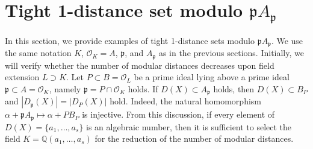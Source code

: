 \documentclass[a4paper, 11pt]{article}
\newcommand{\Q}{\mathbb{Q}}
\newcommand{\p}{\mathfrak{p}}
\newcommand{\Oc}{\mathcal{O}}
\theoremstyle{definition}
\begin{document}
\section{Tight 1-distance set modulo $\p A_\p$} \label{sec:example}
In this section, we provide examples of tight 1-distance sets modulo $\p A_\p$. 
We use the same notation $K$, $\Oc_K=A$, $\p$, and $A_\p$ as in the previous sections. 
Initially, we will verify whether the number of modular distances decreases upon field extension $L \supset K$. 
Let $P\subset B=\mathcal{O}_L$ be a prime ideal lying above a prime ideal $\mathfrak{p} \subset A=\mathcal{O}_K$, namely  $\mathfrak{p}=P \cap \mathcal{O}_K$ holds.  
If $D(X) \subset A_\mathfrak{p}$ holds, then  $D(X) \subset B_P$ and $|D_\mathfrak{p}(X)|=|D_P(X)|$ hold. 
Indeed, the natural homomorphism $\alpha + \mathfrak{p}A_\mathfrak{p} \mapsto 
 \alpha + PB_P$ is injective. 
 From this discussion, if every element of $D(X)=\{a_1,\ldots, a_s\}$ is an algebraic number, then it is sufficient to select the field $K=\Q(a_1,\ldots, a_s)$ for the reduction of the number of modular distances. 
 
\end{document}
